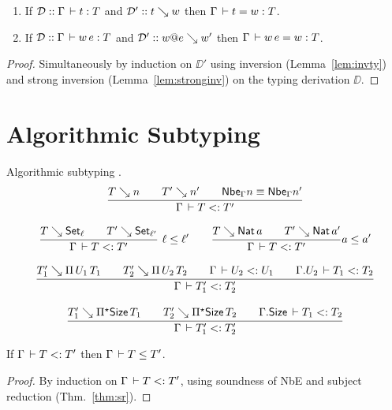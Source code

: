 \documentclass[acmlarge,review,anonymous]{acmart}\settopmatter{printfolios=true}
\begin{document}
\begin{theorem}
  \label{thm:sr}
  \bla
  \begin{enumerate}
  \item
  If\/ $\mathcal{D} :: \Gamma \,\vdash t : T$ and $\mathcal{D}' :: t \searrow w$ then $\Gamma \,\vdash t = w : T$.
  \item
  If\/ $\mathcal{D} :: \Gamma \,\vdash w\, e : T$ and $\mathcal{D}' :: w @ e \searrow w'$ then $\Gamma \,\vdash w\,e = w : T$.
  \end{enumerate}
\end{theorem}
\begin{proof}
  Simultaneously by induction on $\DD'$
  using inversion (Lemma~\ref{lem:invty}) and strong inversion (Lemma~\ref{lem:stronginv})
  on the typing derivation $\DD$. %
\end{proof}

\section{Algorithmic Subtyping}
\label{sec:asub}

Algorithmic subtyping .
\begin{gather*}
  \ru{T \evalsto n \qquad
      T' \evalsto n' \qquad
      \Nbe \Gamma n \equiv \Nbe \Gamma n'
    }{\Gamma \der T \asub T'}
\\[2ex]
  \rux{T \evalsto \Set[\ell] \qquad
      T' \evalsto \Set[\ell']
    }{\Gamma \der T \asub T'
    }{\ell \leq \ell'}
\qquad
  \ru{T \evalsto \Nat a \qquad
      T' \evalsto \Nat a'
    }{\Gamma \der T \asub T'
    }{a \leq a'}
\\[2ex]
  \ru{T_1' \evalsto \piT{U_1}{T_1} \qquad
      T_2' \evalsto \piT{U_2}{T_2} \qquad
      \Gamma \der U_2 \asub U_1 \qquad
      \cext \Gamma {U_2} \der T_1 \asub T_2
    }{\Gamma \der T_1' \asub T_2'}
\\[2ex]
  \ru{T_1' \evalsto \epiT\Size{T_1} \qquad
      T_2' \evalsto \epiT\Size{T_2} \qquad
      \cext \Gamma {\Size} \der T_1 \asub T_2
    }{\Gamma \der T_1' \asub T_2'}
\end{gather*}

\begin{lemma}
  \label{lem:asubsound}
  If\/ $\Gamma \,\vdash T \mathrel{{<}{:}} T'$ then $\Gamma \,\vdash T \leq T'$.
\end{lemma}
\begin{proof}
  By induction on $\Gamma \,\vdash T \mathrel{{<}{:}} T'$, using soundness of NbE and subject reduction (Thm.~\ref{thm:sr}).
\end{proof}
\end{document}
